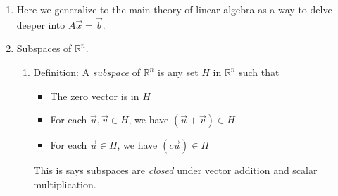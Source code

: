 \documentclass{article}
\begin{document}
\begin{enumerate}

\item Here we generalize to the main theory of linear algebra as a way to delve deeper into $A\vec{x}=\vec{b}$.


\item Subspaces of $\mathbb{R}^n$.
\begin{enumerate}

\item Definition: A \emph{subspace} of $\mathbb{R}^n$ is any set $H$ in $\mathbb{R}^n$ such that
\begin{itemize}
\item The zero vector is in $H$
\item For each $\vec{u}, \vec{v} \in H$, we have $(\vec{u}+\vec{v}) \in H$
\item For each $\vec{u} \in H$, we have $(c\vec{u}) \in H$
\end{itemize}
This is says subspaces are \emph{closed} under vector addition and scalar multiplication.



\end{enumerate}
\end{enumerate}
\end{document}
